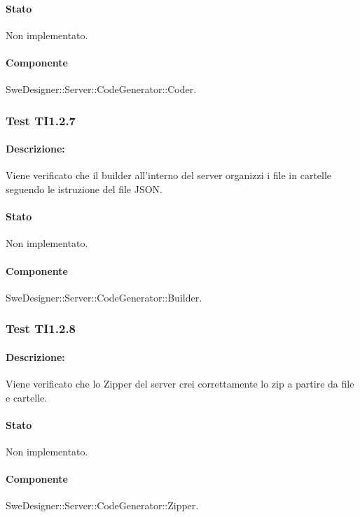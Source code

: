 \documentclass[../PianoDiQualifica.tex]{subfiles}
\begin{document}
	\paragraph{Stato} Non implementato.
	\paragraph{Componente} SweDesigner::Server::CodeGenerator::Coder.
	\subsubsection{Test TI1.2.7}
	\paragraph{Descrizione:} Viene verificato che il builder all'interno del server organizzi i file in cartelle seguendo le istruzione del file JSON.
	\paragraph{Stato} Non implementato.
	\paragraph{Componente} SweDesigner::Server::CodeGenerator::Builder.
		
	\subsubsection{Test TI1.2.8}
	\paragraph{Descrizione:} Viene verificato che lo Zipper del server crei correttamente lo zip a partire da file e cartelle.
	\paragraph{Stato} Non implementato.
	\paragraph{Componente} SweDesigner::Server::CodeGenerator::Zipper.
	
	
\end{document}
